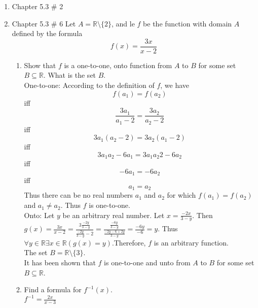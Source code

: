 \documentclass[10pt,a4paper]{article}
\begin{document}
\begin{enumerate}
\begin{enumerate}
\end{enumerate}
\item Chapter 5.3 \# 2
\item Chapter 5.3 \# 6 Let $A = \mathbb{R}\setminus \{2\}$, and le $f$ be the function with domain $A$ defined by the formula $$f(x)=\frac{3x}{x-2}$$
\begin{enumerate}
\item Show that $f$ is  a one-to-one, onto function from $A$ to $B$ for some set $B \subseteq \mathbb{R}$. What is the set $B$. \\ 
One-to-one: According to the definition of $f$, we have\\  $$f(a_1)=f(a_2) $$ iff $$\frac{3a_1}{a_1 -2}=\frac{3a_2}{a_2 -2} $$
iff $$3a_1(a_2 -2)=3a_2(a_1 -2) $$
iff $$3a_1 a_2 - 6a_1 = 3a_1 a_2 2- 6 a_2 $$
iff $$-6a_1=-6a_2$$
iff $$a_1=a_2 $$
Thus there can be no real numbers $a_1$ and $a_2$ for which $f(a_1)=f(a_2)$ and $a_1 \not = a_2$. Thus $f$ is one-to-one.\\
Onto: Let $y$ be an arbitrary real number. Let $x= \frac{-2x}{3-y}$. Then $g(x)= \frac{3x}{x-2}=\frac{3\frac{-2y}{3-y}}{\frac{-2y}{3-y}-2}=\frac{\frac{-6y}{3-y}}{\frac{-2y-6+2y}{3-y}} = \frac{-6y}{-6}=y$. Thus $\forall y \in \mathbb{R} \exists x \in \mathbb{R} (g(x)=y)$.Therefore, $f$ is an arbitrary function. \\
The set $B= \mathbb{R} \setminus \{3\}$.\\
It has been shown that $f$ is one-to-one and unto from $A$ to $B$ for some set $B \subseteq \mathbb{R}$.
\item Find a formula for $f^{-1} (x)$.\\
$f^{-1} = \frac{2x}{x-3}$
\end{enumerate}
\end{enumerate}
\end{document}
